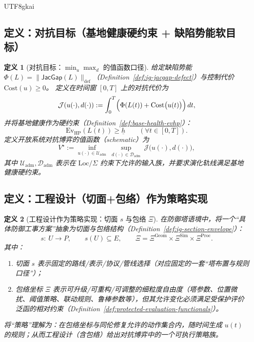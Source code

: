 \documentclass[12pt]{article}
\newtheorem{definition}{定义}[section]
\newcommand{\JacGap}{\ensuremath{\mathsf{JacGap}}}
\begin{document}
\begin{CJK*}{UTF8}{gkai}
\subsection{定义：对抗目标（基地健康硬约束 + 缺陷势能软目标）}

\begin{definition}[对抗目标：$\min_u\max_d$ 的值函数口径]
\label{def:adversarial-objective}
给定缺陷势能 $\Phi(L)=\|\JacGap(L)\|_{\mathrm{def}}$（Definition~\ref{def:ig-jacgap-defect}）与控制代价 $\mathrm{Cost}(u)\ge 0$。
定义在时间窗 $[0,T]$ 上的对抗代价为
\[
\mathcal{J}(u(\cdot),d(\cdot))
:=
\int_0^T
\Bigl(\Phi(L(t))+\mathrm{Cost}\bigl(u(t)\bigr)\Bigr)\,dt,
\]
并将基地健康作为硬约束（Definition~\ref{def:base-health-evhp}）：
\[
\mathrm{Ev}_{\mathrm{HP}}(L(t))\ge \underline{h}\qquad (\forall t\in[0,T]).
\]
定义开放系统对抗博弈的值函数（schematic）为
\[
V^\star
:=
\inf_{u(\cdot)\in\mathcal{U}_{\mathrm{adm}}}
\ \sup_{d(\cdot)\in\mathcal{D}_{\mathrm{adm}}}
\ \mathcal{J}\bigl(u(\cdot),d(\cdot)\bigr),
\]
其中 $\mathcal{U}_{\mathrm{adm}},\mathcal{D}_{\mathrm{adm}}$ 表示在 $\mathrm{Loc}/\Sigma$ 约束下允许的输入族，并要求演化轨线满足基地健康硬约束。
\end{definition}

\subsection{定义：工程设计（切面+包络）作为策略实现}

\begin{definition}[工程设计作为策略实现：切面 $s$ 与包络 $\Xi$]
\label{def:design-as-defense-strategy}
在防御塔语境中，将一个“具体防御工事方案”抽象为切面与包络结构（Definition~\ref{def:ig-section-envelope}）：
\[
s:\ U\to P,\qquad s(U)\subseteq E,\qquad \Xi=\Xi^{\mathrm{Geom}}\times \Xi^{\mathrm{Sim}}\times \Xi^{\mathrm{Proc}}.
\]
其中：
\begin{enumerate}
  \item 切面 $s$ 表示固定的路线/表示/协议/管线选择（对应固定的一套“塔布置与规则口径”）；
  \item 包络坐标 $\Xi$ 表示可升级/可重构/可调整的细粒度自由度（塔参数、位置微扰、阈值策略、联动规则、鲁棒参数等），但其允许变化必须满足受保护评价泛函的相对约束（Definition~\ref{def:protected-evaluation-functionals}）。
\end{enumerate}
将“策略”理解为：在包络坐标与同伦修复允许的动作集合内，随时间生成 $u(t)$ 的规则；从而工程设计（含包络）给出对抗博弈中的一个可执行策略族。
\end{definition}


\end{CJK*}
\end{document}
